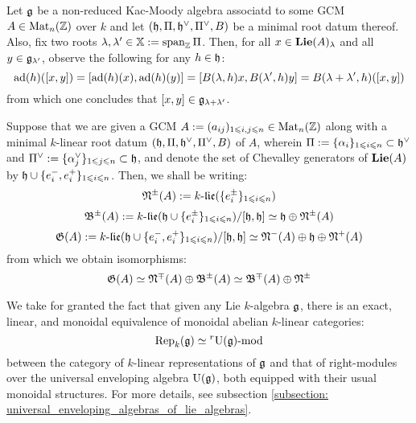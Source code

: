             \begin{remark} \label{remark: root_spaces_and_commutators}
                Let $\mathfrak{g}$ be a non-reduced Kac-Moody algebra associatd to some GCM $A \in \mathrm{Mat}_n(\mathbb{Z})$ over $k$ and let $(\mathfrak{h}, \Pi, \mathfrak{h}^{\vee}, \Pi^{\vee}, B)$ be a minimal root datum thereof. Also, fix two roots $\lambda, \lambda' \in \mathbb{X} := \operatorname{span}_{\mathbb{Z}} \Pi$. Then, for all $x \in \mathbf{Lie}(A)_{\lambda}$ and all $y \in \mathfrak{g}_{\lambda'}$, observe the following for any $h \in \mathfrak{h}$:
                    $$\mathrm{ad}(h)([x, y]) = [\mathrm{ad}(h)(x), \mathrm{ad}(h)(y)] = [B(\lambda, h)x, B(\lambda', h)y] = B(\lambda + \lambda', h)([x, y])$$
                from which one concludes that $[x, y] \in \mathfrak{g}_{\lambda + \lambda'}$.
            \end{remark}
            \begin{convention} \label{conv: unipotent_radicals_of_non_reduced_kac_moody_algebras}
                Suppose that we are given a GCM $A := (a_{ij})_{1 \leqslant i, j \leqslant n} \in \mathrm{Mat}_n(\mathbb{Z})$ along with a minimal $k$-linear root datum $(\mathfrak{h}, \Pi, \mathfrak{h}^{\vee}, \Pi^{\vee}, B)$ of $A$, wherein $\Pi := \{\alpha_i\}_{1 \leqslant i \leqslant n} \subset \mathfrak{h}^{\vee}$ and $\Pi^{\vee} := \{\alpha_j^{\vee}\}_{1 \leqslant j \leqslant n} \subset \mathfrak{h}$, and denote the set of Chevalley generators of $\mathbf{Lie}(A)$ by $\mathfrak{h} \cup \{e_i^-, e_i^+\}_{1 \leqslant i \leqslant n}$. Then, we shall be writing:
                    $$\mathfrak{N}^{\pm}(A) := k\text{-}\mathfrak{lie}(\{e_i^{\pm}\}_{1 \leqslant i \leqslant n})$$
                    $$\mathfrak{B}^{\pm}(A) := k\text{-}\mathfrak{lie}(\mathfrak{h} \cup \{e_i^{\pm}\}_{1 \leqslant i \leqslant n})/[\mathfrak{h}, \mathfrak{h}] \simeq \mathfrak{h} \oplus \mathfrak{N}^{\pm}(A)$$
                    $$\mathfrak{G}(A) := k\text{-}\mathfrak{lie}(\mathfrak{h} \cup \{e_i^-, e_i^+\}_{1 \leqslant i \leqslant n})/[\mathfrak{h}, \mathfrak{h}] \simeq \mathfrak{N}^-(A) \oplus \mathfrak{h} \oplus \mathfrak{N}^+(A)$$
                from which we obtain isomorphisms:
                    $$\mathfrak{G}(A) \simeq \mathfrak{N}^{\mp}(A) \oplus \mathfrak{B}^{\pm}(A) \simeq \mathfrak{B}^{\mp}(A) \oplus \mathfrak{N}^{\pm}$$
            \end{convention}
            \begin{convention}
                We take for granted the fact that given any Lie $k$-algebra $\mathfrak{g}$, there is an exact, linear, and monoidal equivalence of monoidal abelian $k$-linear categories:
                    $$\mathrm{Rep}_k(\mathfrak{g}) \simeq {}^r\mathrm{U}(\mathfrak{g})\text{-}\mathrm{mod}$$
                between the category of $k$-linear representations of $\mathfrak{g}$ and that of right-modules over the universal enveloping algebra $\mathrm{U}(\mathfrak{g})$, both equipped with their usual monoidal structures. For more details, see subsection \ref{subsection: universal_enveloping_algebras_of_lie_algebras}.
            \end{convention}
